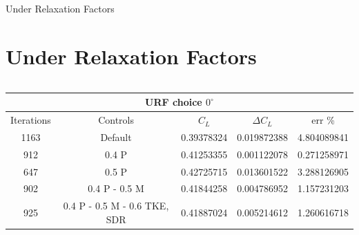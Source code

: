 \documentclass[english,10pt,a4paper,twoside]{beamer}
\newcommand{\ra}[1]{\renewcommand{\arraystretch}{#1}} %
\begin{document}
	\begin{frame}[shrink=55]{Under Relaxation Factors}
		\section{Under Relaxation Factors}
		
	\begin{columns}[T] 
	
		\begin{table}[H]
			\ra{1.2}
			\centering
			\begin{tabular}{|ccccc|}
				\hline
				\multicolumn{5}{|c|}{URF choice $0^\circ$}                                                                                                                                                                                \\ \hline
				\multicolumn{1}{|c|}{Iterations}                  & \multicolumn{1}{c|}{Controls}                              & \multicolumn{1}{c|}{$C_L$}        & \multicolumn{1}{c|}{$\Delta C_L$}  & err \%                                \\ \hline
				\multicolumn{1}{|c|}{1163}                        & \multicolumn{1}{c|}{Default}                               & \multicolumn{1}{c|}{0.39378324} & \multicolumn{1}{c|}{0.019872388} & 4.804089841                         \\ \hline
				\multicolumn{1}{|c|}{\cellcolor[HTML]{9AFF99}912} & \multicolumn{1}{c|}{0.4 P}                                 & \multicolumn{1}{c|}{0.41253355} & \multicolumn{1}{c|}{0.001122078} & \cellcolor[HTML]{34FF34}0.271258971 \\ \hline
				\multicolumn{1}{|c|}{\cellcolor[HTML]{34FF34}647} & \multicolumn{1}{c|}{0.5 P}                                 & \multicolumn{1}{c|}{0.42725715} & \multicolumn{1}{c|}{0.013601522} & 3.288126905                         \\ \hline
				\multicolumn{1}{|c|}{\cellcolor[HTML]{67FD9A}902} & \multicolumn{1}{c|}{\cellcolor[HTML]{FCFF2F}0.4 P - 0.5 M} & \multicolumn{1}{c|}{0.41844258} & \multicolumn{1}{c|}{0.004786952} & \cellcolor[HTML]{67FD9A}1.157231203 \\ \hline
				\multicolumn{1}{|c|}{925}                         & \multicolumn{1}{c|}{0.4 P - 0.5 M - 0.6 TKE, SDR}          & \multicolumn{1}{c|}{0.41887024} & \multicolumn{1}{c|}{0.005214612} & \cellcolor[HTML]{9AFF99}1.260616718 \\ \hline
			\end{tabular}
		\end{table}
		


\end{columns}
\end{frame}
\end{document}
